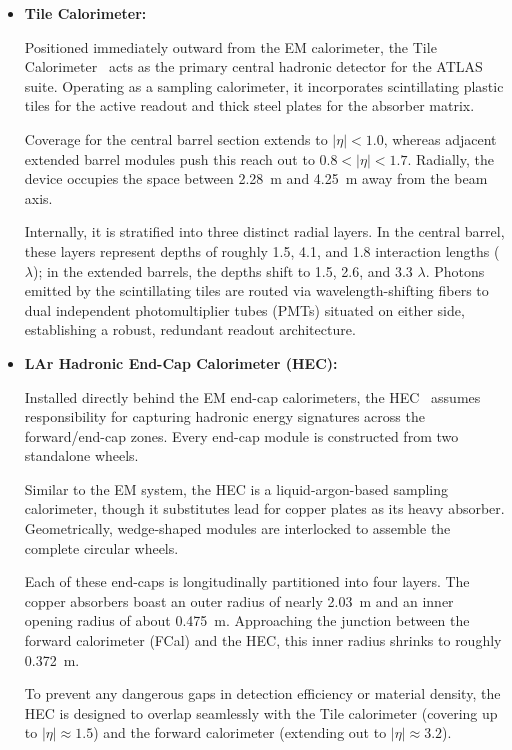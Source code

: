 \begin{itemize}

\item \textbf{Tile Calorimeter:}

Positioned immediately outward from the EM calorimeter, the Tile Calorimeter~\cite{ATLAS-TDR-05} acts as the primary central hadronic detector for the ATLAS suite. Operating as a sampling calorimeter, it incorporates scintillating plastic tiles for the active readout and thick steel plates for the absorber matrix.

Coverage for the central barrel section extends to $|\eta| < 1.0$, whereas adjacent extended barrel modules push this reach out to $0.8 < |\eta| < 1.7$. Radially, the device occupies the space between 2.28~m and 4.25~m away from the beam axis.

Internally, it is stratified into three distinct radial layers. In the central barrel, these layers represent depths of roughly 1.5, 4.1, and 1.8 interaction lengths ($\lambda$); in the extended barrels, the depths shift to 1.5, 2.6, and 3.3 $\lambda$. Photons emitted by the scintillating tiles are routed via wavelength-shifting fibers to dual independent photomultiplier tubes (PMTs) situated on either side, establishing a robust, redundant readout architecture.

\item \textbf{LAr Hadronic End-Cap Calorimeter (HEC):}

Installed directly behind the EM end-cap calorimeters, the HEC~\cite{ATLAS-TDR-04} assumes responsibility for capturing hadronic energy signatures across the forward/end-cap zones. Every end-cap module is constructed from two standalone wheels.

Similar to the EM system, the HEC is a liquid-argon-based sampling calorimeter, though it substitutes lead for copper plates as its heavy absorber. Geometrically, wedge-shaped modules are interlocked to assemble the complete circular wheels.

Each of these end-caps is longitudinally partitioned into four layers. The copper absorbers boast an outer radius of nearly 2.03~m and an inner opening radius of about 0.475~m. Approaching the junction between the forward calorimeter (FCal) and the HEC, this inner radius shrinks to roughly 0.372~m.

To prevent any dangerous gaps in detection efficiency or material density, the HEC is designed to overlap seamlessly with the Tile calorimeter (covering up to $|\eta| \approx 1.5$) and the forward calorimeter (extending out to $|\eta| \approx 3.2$).


\end{itemize}
